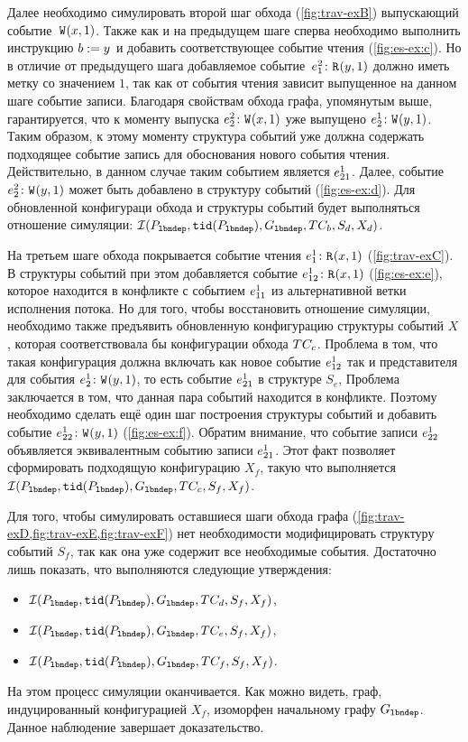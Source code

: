 Далее необходимо симулировать второй шаг обхода
(\cref{fig:trav-exB}) выпускающий событие~${{\mathtt{W}}}^{}({x},{1})$.
Также как и на предыдущем шаге сперва необходимо
выполнить инструкцию $b \;{:=}\;{y}^{}$ и добавить соответствующее
событие чтения (\cref{fig:es-ex:c}). Но в отличие от предыдущего шага
добавляемое событие~$e^{2}_{1}\colon {{\mathtt{R}}}^{}({y},{1})$ должно иметь
метку со значением $1$, так как от события чтения
зависит выпущенное на данном шаге событие записи.
Благодаря свойствам обхода графа, упомянутым выше,
гарантируется, что к моменту выпуска $e^{2}_{2}\colon {{\mathtt{W}}}^{}({x},{1}){}$
уже выпущено $e^{1}_{2}\colon {{\mathtt{W}}}^{}({y},{1})$.
Таким образом, к этому моменту структура событий уже должна
содержать подходящее событие запись для обоснования нового события чтения.
Действительно, в данном случае таким событием является $e^{1}_{21}$.
Далее, событие $e^{2}_{2}\colon {{\mathtt{W}}}^{}({y},{1}){}$ может быть добавлено
в структуру событий (\cref{fig:es-ex:d}).
Для обновленной конфигураци обхода и структуры событий
будет выполняться отношение симуляции:
$\mathcal{I}(P_{\mathtt{lbndep}}, {\mathtt{tid}}(P_{\mathtt{lbndep}}), G_{\mathtt{lbndep}}, TC_b, S_d, X_d)$.

На третьем шаге обхода покрывается событие чтения
$e^{1}_{1}\colon {{\mathtt{R}}}^{}({x},{1})$ (\cref{fig:trav-exC}).
В структуры событий при этом добавляется событие
$e^{1}_{12}\colon {{\mathtt{R}}}^{}({x},{1})$ (\cref{fig:es-ex:e}),
которое находится в конфликте с событием $e^{1}_{11}$
из альтернативной ветки исполнения потока.
Но для того, чтобы восстановить отношение симуляции,
необходимо также предъявить обновленную конфигурацию
структуры событий $X$, которая соответствовала бы
конфигурации обхода $TC_c$.
Проблема в том, что такая конфигурация должна включать
как новое событие $e^{1}_{12}$ так и
представителя для события $e^{1}_{2}\colon {{\mathtt{W}}}^{}({y},{1})$,
то есть событие $e^{1}_{21}$ в структуре $S_e$,
Проблема заключается в том, что данная пара событий
находится в конфликте. 
Поэтому необходимо сделать ещё один шаг построения
структуры событий и добавить событие $e^{1}_{22}\colon {{\mathtt{W}}}^{}({y},{1})$
(\cref{fig:es-ex:f}).
Обратим внимание, что событие записи $e^{1}_{22}$ объявляется
эквивалентным событию записи $e^{1}_{21}$.
Этот факт позволяет сформировать подходящую
конфигурацию $X_f$, такую что выполняется
$\mathcal{I}(P_{\mathtt{lbndep}}, {\mathtt{tid}}(P_{\mathtt{lbndep}}), G_{\mathtt{lbndep}}, TC_c, S_f, X_f)$.

Для того, чтобы симулировать оставшиеся шаги обхода графа
(\cref{fig:trav-exD,fig:trav-exE,fig:trav-exF})
нет необходимости модифицировать структуру событий $S_f$,
так как она уже содержит все необходимые события. 
Достаточно лишь показать, что выполняются следующие утверждения:
\begin{itemize}
  \item $\mathcal{I}(P_{\mathtt{lbndep}}, {\mathtt{tid}}(P_{\mathtt{lbndep}}), G_{\mathtt{lbndep}}, TC_d, S_f, X_f)$,
  \item $\mathcal{I}(P_{\mathtt{lbndep}}, {\mathtt{tid}}(P_{\mathtt{lbndep}}), G_{\mathtt{lbndep}}, TC_e, S_f, X_f)$,
  \item $\mathcal{I}(P_{\mathtt{lbndep}}, {\mathtt{tid}}(P_{\mathtt{lbndep}}), G_{\mathtt{lbndep}}, TC_f, S_f, X_f)$.
\end{itemize}
На этом процесс симуляции оканчивается.
Как можно видеть, граф, индуцированный конфигурацией $X_f$,
изоморфен начальному графу $G_{\mathtt{lbndep}}$.
Данное наблюдение завершает доказательство.
